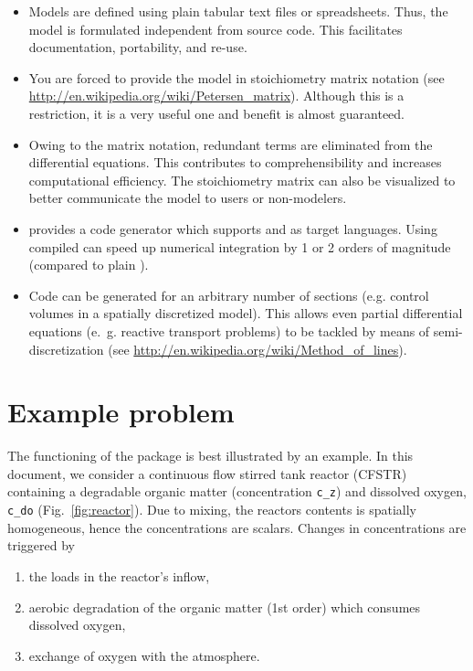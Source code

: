 \documentclass[onecolumn]{article}
\begin{document}
\begin{itemize}
\item Models are defined using plain tabular text files or spreadsheets. Thus, the model is formulated independent from source code. This facilitates documentation, portability, and re-use.
\item You are forced to provide the model in stoichiometry matrix notation (see \url{http://en.wikipedia.org/wiki/Petersen_matrix}). Although this is a restriction, it is a very useful one and benefit is almost guaranteed.
\item Owing to the matrix notation, redundant terms are eliminated from the differential equations. This contributes to comprehensibility and increases computational efficiency. The stoichiometry matrix can also be visualized to better communicate the model to users or non-modelers.
\item {} provides a code generator which supports  and  as target languages. Using compiled  can speed up numerical integration by 1 or 2 orders of magnitude (compared to plain ).
\item Code can be generated for an arbitrary number of sections (e.g. control volumes in a spatially discretized model). This allows even partial differential equations (e.~g. reactive transport problems) to be tackled by means of semi-discretization  (see \url{http://en.wikipedia.org/wiki/Method_of_lines}).
\end{itemize}

\section{Example problem}
The functioning of the package is best illustrated by an example. In this document, we consider a continuous flow stirred tank reactor (CFSTR) containing a degradable organic matter (concentration \verb|c_z|) and dissolved oxygen, \verb|c_do| (Fig.~\ref{fig:reactor}). Due to mixing, the reactors contents is spatially homogeneous, hence the concentrations are scalars. Changes in concentrations are triggered by
\begin{enumerate}
\item the loads in the reactor's inflow,
\item aerobic degradation of the organic matter (1st order) which consumes dissolved oxygen,
\item exchange of oxygen with the atmosphere.
\end{enumerate}
\end{document}

